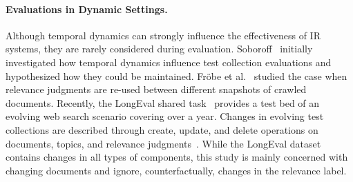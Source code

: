 \paragraph{Evaluations in Dynamic Settings.} Although temporal dynamics can strongly influence the effectiveness of IR systems, they are rarely  considered during evaluation. Soboroff~\cite{DBLP:conf/sigir/Soboroff06} initially investigated how temporal dynamics influence test collection evaluations and hypothesized how they could be maintained. Fr{\"o}be et al.~\cite{froebe:2022d} studied the case when relevance judgments are re-used between different snapshots of crawled documents. Recently, the LongEval shared task~\cite{alkhalifa:2023,DBLP:conf/clef/AlkhalifaBDEAFG24} provides a test bed of an evolving web search scenario covering over a year. Changes in evolving test collections are described through create, update, and delete operations on documents, topics, and relevance judgments~\cite{keller:2024}. While the LongEval dataset contains changes in all types of components, this study is mainly concerned with changing documents and ignore, counterfactually, changes in the relevance label.
